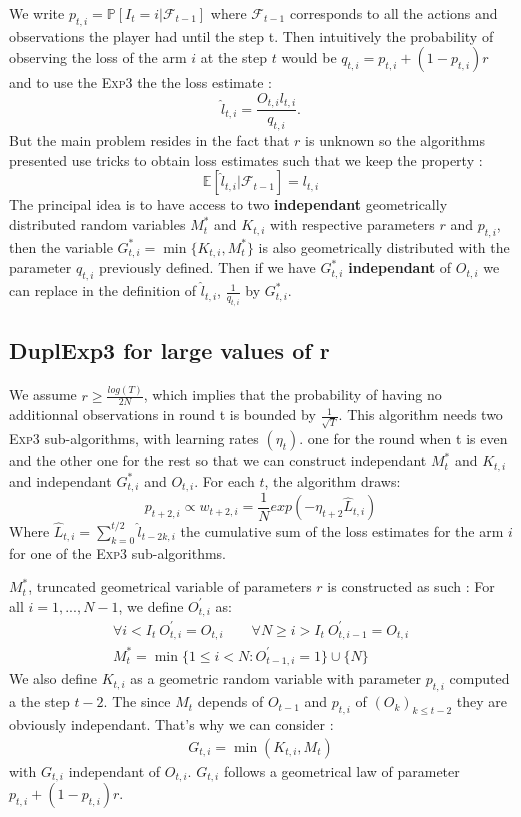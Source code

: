 \documentclass[11pt,a4paper]{article}
\begin{document}
We write $p_{t,i}=\mathbb{P}[I_t=i|\mathcal{F}_{t-1}]$ where $\mathcal{F}_{t-1}$ corresponds to all the actions and observations the player had until the step t. Then intuitively the probability of observing the loss of the arm $i$ at the step $t$ would be $q_{t,i}=p_{t,i} + (1-p_{t,i})r$ and to use the \textsc{Exp}$3$
the the loss estimate :
\[
\hat{l}_{t,i}=\frac{O_{t,i}l_{t,i}}{q_{t,i}}.
\]
But the main problem resides in the fact that $r$ is unknown so the algorithms presented use tricks to obtain loss estimates such that we keep the property :
\[
\mathbb{E}[\hat{l}_{t,i}|\mathcal{F}_{t-1}]=l_{t,i}
\]
The principal idea is to have access to two \textbf{independant} geometrically distributed random variables $M_t^*$ and $K_{t,i}$ with respective parameters $r$ and $p_{t,i}$, then the variable $G_{t,i}^*=\min\{K_{t,i},M_t^*\}$ is also geometrically distributed with the parameter $q_{t,i}$ previously defined. Then if we have $G_{t,i}^*$ \textbf{independant} of $O_{t,i}$ we can replace in the definition of $\hat{l}_{t,i}$, $\frac{1}{q_{t,i}}$ by $G_{t,i}^*$.

\subsection{DuplExp3 for large values of r}
\paragraph{}We assume $ r\geq \frac{log(T)}{2N}$, which implies that the probability of having no additionnal observations in round t is bounded by $\frac{1}{\sqrt{T}}$.\newline
This algorithm needs two \textsc{Exp3} sub-algorithms, with learning rates $\left(\eta_t\right)$. one for the round when t is even and the other one for the rest so that we can construct independant $M_t^*$ and $K_{t,i}$ and independant $G_{t,i}^*$ and $O_{t,i}$.
For each $t$, the algorithm draws:
\[
p_{t+2,i}\propto w_{t+2,i}= \frac{1}{N} exp\left( -\eta_{t+2} \hat{L}_{t,i} \right)
\]
Where $\hat{L}_{t,i}=\sum_{k=0}^{t/2} \hat{l}_{t-2k,i}$ the cumulative sum of the loss estimates for the arm $i$ for one of the \textsc{Exp3} sub-algorithms.

$M_t^*$, truncated geometrical variable of parameters $r$ is constructed as such : 
For all $i=1,...,N-1$, we define $O_{t,i}^{'}$ as:
\begin{align*}
\forall i<I_{t}\ O_{t,i}^{'}=O_{t,i} \qquad \forall N\geq i>I_{t}\ O_{t,i-1}^{'}=O_{t,i} \\
M_t^* =\min\{1\leq i<N: O_{t-1,i}^{'} =1\}\cup\{N\}
\end{align*}
We also define $K_{t,i}$ as a geometric random variable with parameter $p_{t,i}$ computed a the step $t-2$. The since $M_t$ depends of $O_{t-1}$ and $p_{t,i}$ of $\left(O_k\right)_{k\leq t-2}$ they are obviously independant. That's why we can consider :
\begin{align*}
	G_{t,i}=\min\left(K_{t,i},M_t\right)
\end{align*}
with $G_{t,i}$ independant of $O_{t,i}$. $G_{t,i}$ follows a geometrical law of parameter $p_{t,i}+(1-p_{t,i})r$.
\end{document}
